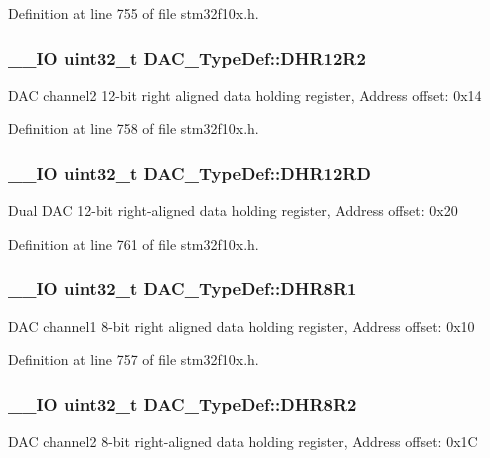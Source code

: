 Definition at line 755 of file stm32f10x.\-h.

\hypertarget{struct_d_a_c___type_def_ab1f777540c487c26bf27e6fa37a644cc}{
\subsubsection[{D\-H\-R12\-R2}]{\setlength{\rightskip}{0pt plus 5cm}\-\_\-\-\_\-\-I\-O {\bf uint32\-\_\-t} D\-A\-C\-\_\-\-Type\-Def\-::\-D\-H\-R12\-R2}}\label{struct_d_a_c___type_def_ab1f777540c487c26bf27e6fa37a644cc}
D\-A\-C channel2 12-\/bit right aligned data holding register, Address offset\-: 0x14 

Definition at line 758 of file stm32f10x.\-h.

\hypertarget{struct_d_a_c___type_def_affa5cc9fe0cc9eb594d703bdc9d9abd9}{
\subsubsection[{D\-H\-R12\-R\-D}]{\setlength{\rightskip}{0pt plus 5cm}\-\_\-\-\_\-\-I\-O {\bf uint32\-\_\-t} D\-A\-C\-\_\-\-Type\-Def\-::\-D\-H\-R12\-R\-D}}\label{struct_d_a_c___type_def_affa5cc9fe0cc9eb594d703bdc9d9abd9}
Dual D\-A\-C 12-\/bit right-\/aligned data holding register, Address offset\-: 0x20 

Definition at line 761 of file stm32f10x.\-h.

\hypertarget{struct_d_a_c___type_def_a3a382d341fb608a04390bacb8c00b0f0}{
\subsubsection[{D\-H\-R8\-R1}]{\setlength{\rightskip}{0pt plus 5cm}\-\_\-\-\_\-\-I\-O {\bf uint32\-\_\-t} D\-A\-C\-\_\-\-Type\-Def\-::\-D\-H\-R8\-R1}}\label{struct_d_a_c___type_def_a3a382d341fb608a04390bacb8c00b0f0}
D\-A\-C channel1 8-\/bit right aligned data holding register, Address offset\-: 0x10 

Definition at line 757 of file stm32f10x.\-h.

\hypertarget{struct_d_a_c___type_def_a3b096b71656f8fb32cd18b4c8b1d2334}{
\subsubsection[{D\-H\-R8\-R2}]{\setlength{\rightskip}{0pt plus 5cm}\-\_\-\-\_\-\-I\-O {\bf uint32\-\_\-t} D\-A\-C\-\_\-\-Type\-Def\-::\-D\-H\-R8\-R2}}\label{struct_d_a_c___type_def_a3b096b71656f8fb32cd18b4c8b1d2334}
D\-A\-C channel2 8-\/bit right-\/aligned data holding register, Address offset\-: 0x1\-C 

